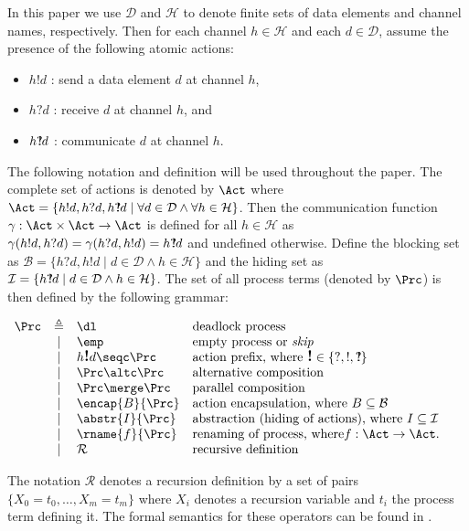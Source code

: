 \documentclass[a4paper,english,final]{article}
\theoremstyle{plain}
\theoremstyle{definition}
\newcommand{\com}{\ensuremath{?\mkern-6mu!}}
\newcommand{\chan}{\ensuremath{\mathcal{H}}}
\newcommand{\data}{\ensuremath{\mathcal{D}}}
\newcommand{\hide}{\ensuremath{\mathcal{I}}}
\newcommand{\block}{\ensuremath{\mathcal{B}}}
\begin{document}
In this paper we use $\data$ and $\chan$ to denote finite sets of data elements and channel names, respectively. Then for each channel $h\in \chan$ and each $d\in\data$, assume the presence of the following atomic actions:
\begin{itemize}
\item $h!d$ : send a data element $d$ at channel $h$,
\item $h?d$ : receive $d$ at channel $h$, and
\item $h\com d$ : communicate $d$ at channel $h$.
\end{itemize}

The following notation and definition will be used throughout the paper. The complete set of actions is denoted by $\Act$ where $\Act=\{h!d,h?d,h\com d\mid \forall d\in\data \wedge \forall h\in\chan\}$. Then the communication function $\gamma:\Act\times\Act\rightarrow\Act$ is defined for all $h\in\chan$ as $\gamma(h!d,h?d)=\gamma(h?d,h!d)=h\com d$ and undefined otherwise. Define the blocking set as $\block=\{h?d,h!d\mid d\in\data \wedge h\in\chan\}$ and the hiding set as $\hide=\{h\com d\mid d\in\data\wedge h\in\chan\}$.
The set of all process terms (denoted by $\Prc$) is then defined by the following grammar:
\begin{center}
$\begin{array}{lcll}
    \Prc& \triangleq & \dl & \mbox{deadlock process}\\
    &\mid & \emp & \mbox{empty process or \textit{skip}}\\
    &\mid & h\textbf{\large{!}}d\seqc \Prc & \mbox{action prefix, where }\textbf{\large{!}}\in\{?,!,\com\}\\
    &\mid & \Prc\altc\Prc & \mbox{alternative composition}\\
    &\mid & \Prc\merge\Prc & \mbox{parallel composition}\\
    &\mid & \encap{B}{\Prc} & \mbox{action encapsulation, where }B\subseteq\block\\
    &\mid & \abstr{I}{\Prc} & \mbox{abstraction (hiding of actions), where }I\subseteq\hide\\
    &\mid & \rname{f}{\Prc} & \mbox{renaming of process, where} f:\Act\rightarrow\Act.\\
    &\mid & \mathcal{R} & \mbox{recursive definition}
\end{array}$
\end{center}
The notation $\mathcal{R}$ denotes a recursion definition by a set of pairs $\{X_0=t_0,\dots, X_m=t_m\}$ where $X_i$ denotes a recursion variable and $t_i$ the process term defining it. The formal semantics for these operators can be found in \citep{acpbook}.
\end{document}
